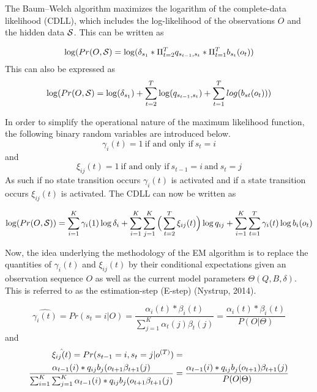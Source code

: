 The Baum–Welch algorithm maximizes the logarithm of the complete-data likelihood (CDLL), which includes the log-likelihood of the observations $O$ and the hidden data $\S$. This can be written as

\begin{equation}
    \log(Pr(O, \S) = \log(\delta_{s_1} * \Pi_{t=2}^T q_{s_{t-1},s_t} * \Pi_{t=1}^T b_{s_t}(o_t)) 
\end{equation}
This can also be expressed as
\begin{equation}
    \log(Pr(O,\S) = \log(\delta_{s_1}) + \sum_{t=2}^T \log(q_{s_{t-1},s_t})+\sum_{t=1}^T log(b_{st}(o_t)))
\end{equation}

In order to simplify the operational nature of the maximum likelihood function, the following binary random variables are introduced below.
$$
\gamma_i(t) = 1 \ \text{if and only if}\ s_t = i
$$
and
$$
\xi_{ij}(t) = 1 \ \text{if and only if}\ s_{t-1}=i\ \text{and}\ s_t = j
$$
As such if no state transition occurs $\gamma_i(t)$ is activated and if a state transition occurs $\xi_{ij}(t)$ is activated. The CDLL can now be written as

\begin{equation}
    \log(Pr(O, \S)) = \sum_{i=1}^K \gamma_i(1) \log\delta_i + \sum_{i=1}^K \sum_{j=1}^K \Big(\sum_{t=2}^T \xi_{ij}(t)\Big) \log q_{ij}+ \sum_{i=1}^K \sum_{t=1}^T \gamma_i(t) \log b_i(o_t) 
    \label{eq: CDLL}
\end{equation}

Now, the idea underlying the methodology of the EM algorithm is to replace the quantities of $\gamma_i(t)$ and $\xi_{ij}(t)$ by their conditional expectations given an observation sequence $O$ as well as the current model parameters $\Theta(Q, B,\delta)$. This is referred to as the estimation-step (E-step) (Nystrup, 2014). 

\begin{equation}
    \hat{\gamma_i(t)} = Pr(s_t=i | O) = \frac{\alpha_i(t)*\beta_i(t)}{\sum_{j=1}^K \alpha_t(j)\beta_t(j)} = \frac{\alpha_i(t)*\beta_i(t)}{P(O|\Theta)}
    \label{eq: gamma}
\end{equation}
and
\begin{align}
    \hat{\xi_{ij}(t)} = Pr(s_{t-1}=i, s_t=j|o^{(T)}) &= \label{eq: xi} \\ 
    \frac{\alpha_{t-1}(i)*q_{ij}b_j(o_{t+1}\beta_{t+1}(j)}
            {\sum_{i=1}^K\sum_{j=1}^K\alpha_{t-1}(i)*q_{ij}b_j(o_{t+1}\beta_{t+1}(j)}
    &= \frac{\alpha_{t-1}(i)*q_{ij}b_j(o_{t+1})\beta_{t+1}(j)}{P(O|\Theta)}  \notag
\end{align}

